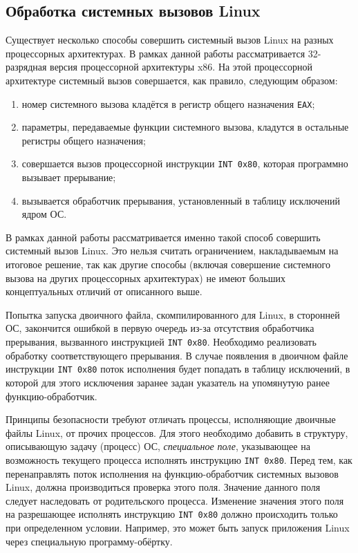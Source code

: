 
\subsection{Обработка системных вызовов Linux}
Существует несколько способы совершить системный вызов Linux на разных процессорных архитектурах. В рамках данной работы рассматривается 32-разрядная версия процессорной архитектуры x86. На этой процессорной архитектуре системный вызов совершается, как правило, следующим образом:
\begin{enumerate}
    \item номер системного вызова кладётся в регистр общего назначения \texttt{EAX};
    \item параметры, передаваемые функции системного вызова, кладутся в остальные регистры общего назначения;
    \item совершается вызов процессорной инструкции \texttt{INT 0x80}, которая программно вызывает прерывание;
    \item вызывается обработчик прерывания, установленный в таблицу исключений ядром ОС.
\end{enumerate}
В рамках данной работы рассматривается именно такой способ совершить системный вызов Linux. Это нельзя считать ограничением, накладываемым на итоговое решение, так как другие способы (включая совершение системного вызова на других процессорных архитектурах) не имеют больших концептуальных отличий от описанного выше.

Попытка запуска двоичного файла, скомпилированного для Linux, в сторонней ОС, закончится ошибкой в первую очередь из-за отсутствия обработчика прерывания, вызванного инструкцией \texttt{INT 0x80}. Необходимо реализовать обработку соответствующего прерывания. В случае появления в двоичном файле инструкции \texttt{INT 0x80} поток исполнения будет попадать в таблицу исключений, в которой для этого исключения заранее задан указатель на упомянутую ранее функцию-обработчик.

Принципы безопасности требуют отличать процессы, исполняющие двоичные файлы Linux, от прочих процессов. Для этого необходимо добавить в структуру, описывающую задачу (процесс) ОС, \textit{специальное поле}, указывающее на возможность текущего процесса исполнять инструкцию \texttt{INT 0x80}. Перед тем, как перенаправлять поток исполнения на функцию-обработчик системных вызовов Linux, должна производиться проверка этого поля. Значение данного поля следует наследовать от родительского процесса. Изменение значения этого поля на разрешающее исполнять инструкцию \texttt{INT 0x80} должно происходить только при определенном условии. Например, это может быть запуск приложения Linux через специальную программу-обёртку.


